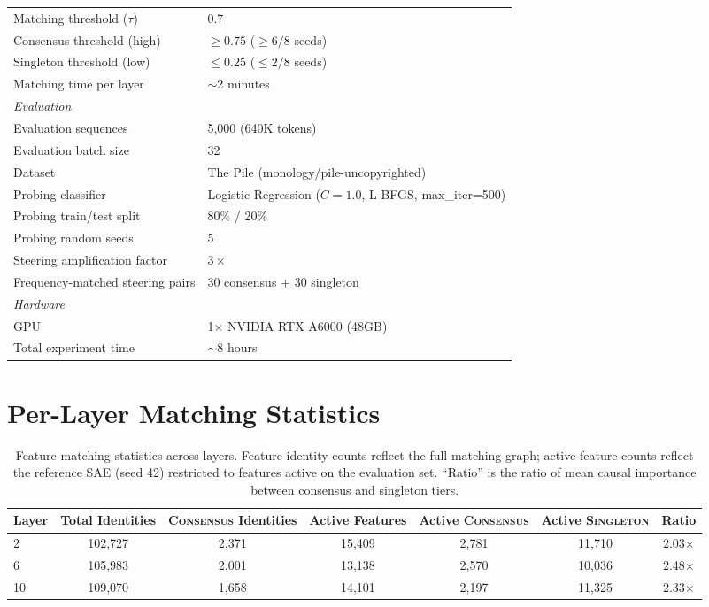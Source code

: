 \documentclass{article}
\newcommand{\consensus}{\textsc{Consensus}}
\newcommand{\singleton}{\textsc{Singleton}}
\begin{document}
\begin{table}[h]
\begin{tabular}{ll}
Matching threshold ($\tau$) & 0.7 \\
Consensus threshold (high) & $\geq 0.75$ ($\geq 6/8$ seeds) \\
Singleton threshold (low) & $\leq 0.25$ ($\leq 2/8$ seeds) \\
Matching time per layer & $\sim$2 minutes \\
\midrule
\multicolumn{2}{l}{\emph{Evaluation}} \\
Evaluation sequences & 5{,}000 (640K tokens) \\
Evaluation batch size & 32 \\
Dataset & The Pile (monology/pile-uncopyrighted) \\
Probing classifier & Logistic Regression ($C = 1.0$, L-BFGS, max\_iter=500) \\
Probing train/test split & 80\% / 20\% \\
Probing random seeds & 5 \\
Steering amplification factor & $3\times$ \\
Frequency-matched steering pairs & 30 consensus + 30 singleton \\
\midrule
\multicolumn{2}{l}{\emph{Hardware}} \\
GPU & 1$\times$ NVIDIA RTX A6000 (48GB) \\
Total experiment time & $\sim$8 hours \\
\bottomrule
\end{tabular}
\end{table}

\section{Per-Layer Matching Statistics}
\label{app:matching}

\begin{table}[h]
\caption{Feature matching statistics across layers. Feature identity counts reflect the full matching graph; active feature counts reflect the reference SAE (seed 42) restricted to features active on the evaluation set. ``Ratio'' is the ratio of mean causal importance between consensus and singleton tiers.}
\label{tab:matching}
\centering
\small
\begin{tabular}{lcccccc}
\toprule
Layer & Total Identities & \consensus{} Identities & Active Features & Active \consensus{} & Active \singleton{} & Ratio \\
\midrule
2  & 102{,}727 & 2{,}371 & 15{,}409 & 2{,}781 & 11{,}710 & 2.03$\times$ \\
6  & 105{,}983 & 2{,}001 & 13{,}138 & 2{,}570 & 10{,}036 & 2.48$\times$ \\
10 & 109{,}070 & 1{,}658 & 14{,}101 & 2{,}197 & 11{,}325 & 2.33$\times$ \\
\bottomrule
\end{tabular}
\end{table}
\end{document}
